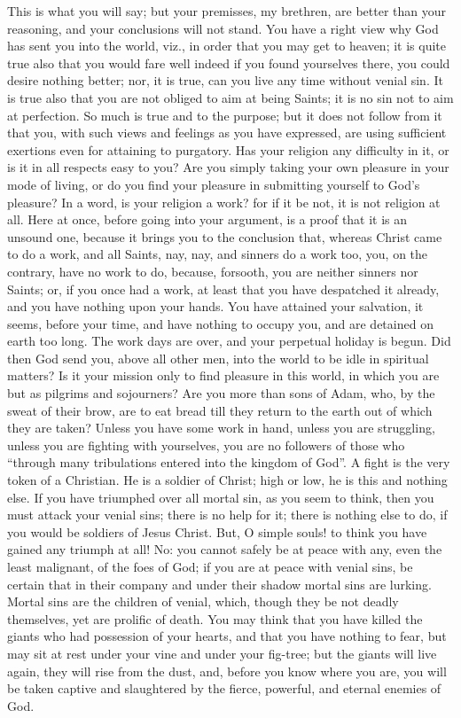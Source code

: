 This is what you will say; but your premisses, my brethren, are
better than your reasoning, and your conclusions will not stand. You
have a right view why God has sent you into the world, viz., in order
that you may get to heaven; it is quite true also that you would fare
well indeed if you found yourselves there, you could desire nothing
better; nor, it is true, can you live any time without venial sin. It
is true also that you are not obliged to aim at being Saints; it is no
sin not to aim at perfection. So much is true and to the purpose; but
it does not follow from it that you, with such views and feelings as
you have expressed, are using sufficient exertions even for attaining
to purgatory. Has your religion any difficulty in it, or is it in all
respects easy to you? Are you simply taking your own pleasure in your
mode of living, or do you find your pleasure in submitting yourself to
God's pleasure? In a word, is your religion a work? for if it be not,
it is not religion at all. Here at once, before going into your
argument, is a proof that it is an unsound one, because it brings you
to the conclusion that, whereas Christ came to do a work, and all
Saints, nay, nay, and sinners do a work too, you, on the contrary,
have no work to do, because, forsooth, you are neither sinners nor
Saints; or, if you once had a work, at least that you have despatched
it already, and you have nothing upon your hands. You have attained
your salvation, it seems, before your time, and have nothing to occupy
you, and are detained on earth too long. The work days are over, and
your perpetual holiday is begun. Did then God send you, above all
other men, into the world to be idle in spiritual matters? Is it your
mission only to find pleasure in this world, in which you are but as
pilgrims and sojourners? Are you more than sons of Adam, who, by the
sweat of their brow, are to eat bread till they return to the earth
out of which they are taken? Unless you have some work in hand, unless
you are struggling, unless you are fighting with yourselves, you are
no followers of those who ``through many tribulations entered into
the kingdom of God''. A fight is the very token of a Christian. He
is a soldier of Christ; high or low, he is this and nothing else. If
you have triumphed over all mortal sin, as you seem to think, then you
must attack your venial sins; there is no help for it; there is
nothing else to do, if you would be soldiers of Jesus Christ. But, O
simple souls! to think you have gained any triumph at all! No: you
cannot safely be at peace with any, even the least malignant, of the
foes of God; if you are at peace with venial sins, be certain that in
their company and under their shadow mortal sins are lurking. Mortal
sins are the children of venial, which, though they be not deadly
themselves, yet are prolific of death. You may think that you have
killed the giants who had possession of your hearts, and that you have
nothing to fear, but may sit at rest under your vine and under your
fig-tree; but the giants will live again, they will rise from the
dust, and, before you know where you are, you will be taken captive
and slaughtered by the fierce, powerful, and eternal enemies of God.

